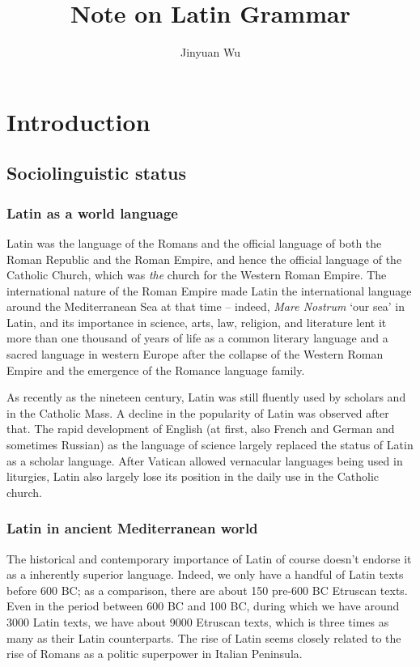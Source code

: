 \documentclass[a4paper, oneside, 12pt]{report}
\title{Note on Latin Grammar}
\author{Jinyuan Wu}
\newcommand{\form}[1]{\emph{#1}}
\newcommand{\translate}[1]{`#1'}
\begin{document}
\automath

\maketitle

\chapter{Introduction}

\section{Sociolinguistic status}

\subsection{Latin as a world language}

Latin was the language of the Romans
and the official language of both the Roman Republic and the Roman Empire,
and hence the official language of the Catholic Church, 
which was \emph{the} church for the Western Roman Empire. 
The international nature of the Roman Empire made Latin 
the international language around the Mediterranean Sea at that time -- 
indeed, \form{Mare Nostrum} \translate{our sea} in Latin,
and its importance in science, arts, law, religion, and literature 
lent it more than one thousand of years of life 
as a common literary language and a sacred language in western Europe
after the collapse of the Western Roman Empire 
and the emergence of the Romance language family.

As recently as the nineteen century,
Latin was still fluently used by scholars and in the Catholic Mass. 
A decline in the popularity of Latin was observed after that.
The rapid development of English (at first, also French and German and sometimes Russian)
as the language of science 
largely replaced the status of Latin as a scholar language.
After Vatican allowed vernacular languages being used in liturgies, 
Latin also largely lose its position in the daily use in the Catholic church. 

\subsection{Latin in ancient Mediterranean world}

The historical and contemporary importance of Latin 
of course doesn't endorse it as a inherently superior language. 
Indeed, we only have a handful of Latin texts before 600 BC; 
as a comparison, there are about 150 pre-600 BC Etruscan texts.
Even in the period between 600 BC and 100 BC, 
during which we have around 3000 Latin texts,
we have about 9000 Etruscan texts, 
which is three times as many as their Latin counterparts. 
The rise of Latin seems closely related to the rise of Romans as a politic superpower
in Italian Peninsula.
\end{document}
